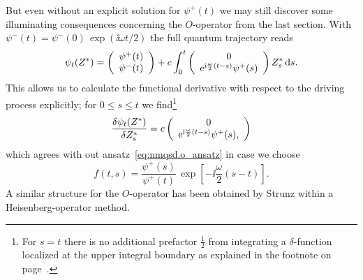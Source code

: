 But even without an explicit solution for $\psi^+(t)$ we may still discover some illuminating consequences concerning the $O$-operator from the last section.
With $\psi^-(t) = \psi^-(0) \, \exp(\ii \omega t / 2)$ the full quantum trajectory reads
\begin{equation}
  \psi_t(\ZZ) = \left(\begin{array}{c}
    \psi^+(t) \\ \psi^-(t)
    \end{array}\right)
  + c \int_0^t \left(\begin{array}{c}
    0 \\ \exp[\ii \frac{\omega}{2} (t-s)] \psi^+(s)
    \end{array}\right)
  \ZZ_s \dd s.
  \label{eq:nmqsd.solution}
\end{equation}
This allows us to calculate the functional derivative with respect to the driving process explicitly;
for $0 \le s \le t$ we find\footnote{For $s = t$ there is no additional prefactor $\frac{1}{2}$ from integrating a $\delta$-function localized at the upper integral boundary as explained in the footnote on page~\pageref{fn:tla.boundaries}.}
\begin{equation*}
  \frac{\delta \psi_t(\ZZ)}{\delta \ZZ_s} = c \left(\begin{array}{c}
    0 \\ \exp[\ii \frac{\omega}{2}(t - s)] \psi^+(s),
    \end{array}\right)
\end{equation*}
which agrees with out ansatz~\ref{eq:nmqsd.o_ansatz} in case we choose
\begin{equation}
  f(t, s) = \frac{\psi^+(s)}{\psi^+(t)} \, \exp[-\ii \frac{\omega}{2}(s - t)].
  \label{eq:nmqsd.o_ansatz_psi}
\end{equation}
A similar structure for the $O$-operator has been obtained by Strunz \cite{St01_habil} within a Heisenberg-operator method.
